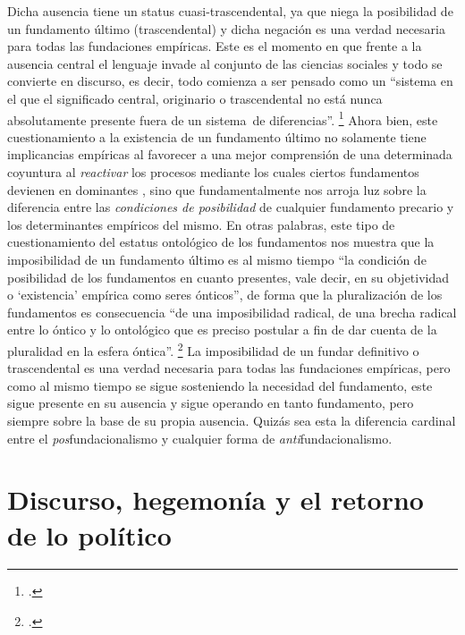 Dicha ausencia tiene un status cuasi-trascendental, ya que niega la posibilidad de un fundamento último (trascendental) y dicha negación es una verdad necesaria para todas las fundaciones empíricas. Este es el momento en que frente a la ausencia central el lenguaje invade al conjunto de las ciencias sociales y todo se convierte en discurso, es decir, todo comienza a ser pensado como un \enquote{sistema en el que el significado central, originario o trascendental no está nunca absolutamente presente fuera de un sistema~de diferencias}. \footcite[][385]{@6997-DERRIDA1989} Ahora bien, este cuestionamiento a la existencia de un fundamento último no solamente tiene implicancias empíricas al favorecer a una mejor comprensión de una determinada coyuntura al \emph{reactivar} los procesos mediante los cuales ciertos fundamentos  devienen en dominantes , sino que fundamentalmente nos arroja luz sobre la diferencia entre las \emph{condiciones de posibilidad} de cualquier fundamento precario y los determinantes empíricos del mismo. En otras palabras, este tipo de cuestionamiento del estatus ontológico de los fundamentos nos muestra que la imposibilidad de un fundamento último es al mismo tiempo \enquote{la condición de posibilidad de los fundamentos en cuanto presentes, vale decir, en su objetividad o \enquote{existencia} empírica como seres ónticos}, de forma que la pluralización de los fundamentos es consecuencia \enquote{de una imposibilidad radical, de una brecha radical entre lo óntico y lo ontológico que es preciso postular a fin de dar cuenta de la pluralidad en la esfera óntica}. \footcite[][30]{@6998-MARCHART2009} La imposibilidad de un fundar definitivo o trascendental es una verdad necesaria  para todas las fundaciones empíricas, pero como al mismo tiempo se sigue sosteniendo la necesidad del fundamento, este sigue presente en su ausencia y sigue operando en tanto fundamento, pero siempre sobre la base de su propia ausencia. Quizás sea esta la diferencia cardinal entre el \emph{pos}fundacionalismo y cualquier forma de \emph{anti}fundacionalismo.


\section{Discurso, hegemonía y el retorno de lo político}

